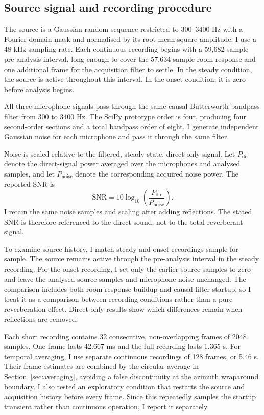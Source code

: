 \documentclass{edpsci}
\begin{document}
\subsection{Source signal and recording procedure}

The source is a Gaussian random sequence restricted to 300--3400 Hz with a Fourier-domain mask and normalised by its root mean square amplitude. I use a 48 kHz sampling rate. Each continuous recording begins with a 59,682-sample pre-analysis interval, long enough to cover the 57,634-sample room response and one additional frame for the acquisition filter to settle. In the steady condition, the source is active throughout this interval. In the onset condition, it is zero before analysis begins.

All three microphone signals pass through the same causal Butterworth bandpass filter from 300 to 3400 Hz. The SciPy prototype order is four, producing four second-order sections and a total bandpass order of eight. I generate independent Gaussian noise for each microphone and pass it through the same filter.

Noise is scaled relative to the filtered, steady-state, direct-only signal. Let $P_{\mathrm{dir}}$ denote the direct-signal power averaged over the microphones and analysed samples, and let $P_{\mathrm{noise}}$ denote the corresponding acquired noise power. The reported SNR is
\begin{equation}
	\mathrm{SNR}
	=
	10\log_{10}
	\left(
	\frac{P_{\mathrm{dir}}}{P_{\mathrm{noise}}}
	\right).
\end{equation}
I retain the same noise samples and scaling after adding reflections. The stated SNR is therefore referenced to the direct sound, not to the total reverberant signal.

To examine source history, I match steady and onset recordings sample for sample. The source remains active through the pre-analysis interval in the steady recording. For the onset recording, I set only the earlier source samples to zero and leave the analysed source samples and microphone noise unchanged. The comparison includes both room-response buildup and causal-filter startup, so I treat it as a comparison between recording conditions rather than a pure reverberation effect. Direct-only results show which differences remain when reflections are removed.

Each short recording contains 32 consecutive, non-overlapping frames of 2048 samples. One frame lasts 42.667 ms and the full recording lasts 1.365 s. For temporal averaging, I use separate continuous recordings of 128 frames, or 5.46 s. Their frame estimates are combined by the circular average in Section~\ref{sec:averaging}, avoiding a false discontinuity at the azimuth wraparound boundary. I also tested an exploratory condition that restarts the source and acquisition history before every frame. Since this repeatedly samples the startup transient rather than continuous operation, I report it separately.
\end{document}
